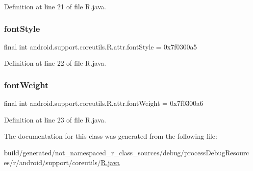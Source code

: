 Definition at line 21 of file R.\+java.

\mbox{\label{classandroid_1_1support_1_1coreutils_1_1_r_1_1attr_a9b35d3307670f8ef6f267a5b6d5bfc29}} 
\subsubsection{\texorpdfstring{fontStyle}{fontStyle}}
{\footnotesize\ttfamily final int android.\+support.\+coreutils.\+R.\+attr.\+font\+Style = 0x7f0300a5\hspace{0.3cm}{\ttfamily [static]}}



Definition at line 22 of file R.\+java.

\mbox{\label{classandroid_1_1support_1_1coreutils_1_1_r_1_1attr_a7c873eec8f29f4228759f62bbcd2969d}} 
\subsubsection{\texorpdfstring{fontWeight}{fontWeight}}
{\footnotesize\ttfamily final int android.\+support.\+coreutils.\+R.\+attr.\+font\+Weight = 0x7f0300a6\hspace{0.3cm}{\ttfamily [static]}}



Definition at line 23 of file R.\+java.



The documentation for this class was generated from the following file\+:\begin{DoxyCompactItemize}
\item 
build/generated/not\+\_\+namespaced\+\_\+r\+\_\+class\+\_\+sources/debug/process\+Debug\+Resources/r/android/support/coreutils/\mbox{\hyperlink{android_2support_2coreutils_2_r_8java}{R.\+java}}\end{DoxyCompactItemize}
